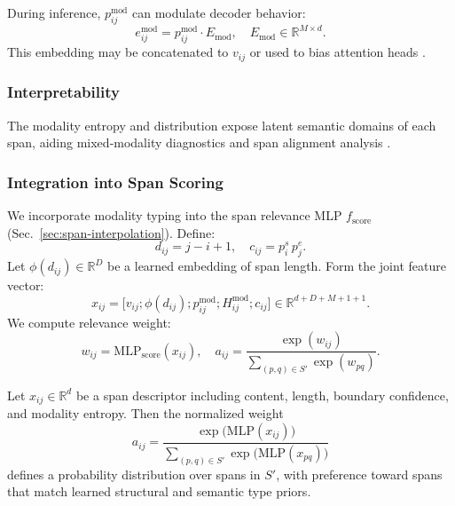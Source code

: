 During inference, \(p^{\mathrm{mod}}_{ij}\) can modulate decoder behavior:
\[
e^{\mathrm{mod}}_{ij} = p^{\mathrm{mod}}_{ij} \cdot E_{\mathrm{mod}},
\quad
E_{\mathrm{mod}}\in\mathbb{R}^{M\times d}.
\]
This embedding may be concatenated to \(v_{ij}\) or used to bias attention heads \cite{li2021prefix}.

\subsubsection{Interpretability}

The modality entropy and distribution expose latent semantic domains of each span, aiding mixed‐modality diagnostics and span alignment analysis \cite{lin2021codemix, tay2021charformer}.

\subsubsection{Integration into Span Scoring}

We incorporate modality typing into the span relevance MLP \(f_{\mathrm{score}}\) (Sec.~\ref{sec:span-interpolation}). Define:
\[
d_{ij} = j - i + 1,
\quad
c_{ij} = p^s_i\,p^e_j.
\]
Let \(\phi(d_{ij})\in\mathbb{R}^D\) be a learned embedding of span length. Form the joint feature vector:
\[
x_{ij}
= \bigl[
v_{ij};
\phi(d_{ij});
p^{\mathrm{mod}}_{ij};
H^{\mathrm{mod}}_{ij};
c_{ij}
\bigr]
\in \mathbb{R}^{d + D + M + 1 + 1}.
\]
We compute relevance weight:
\[
w_{ij} = \mathrm{MLP}_{\mathrm{score}}(x_{ij}),
\quad
a_{ij} = \frac{\exp(w_{ij})}{\sum_{(p,q)\in S'}\exp(w_{pq})}.
\]

\begin{proposition}
	Let \(x_{ij}\in\mathbb{R}^d\) be a span descriptor including content, length, boundary confidence, and modality entropy.  Then the normalized weight
	\[
	a_{ij}
	= \frac{\exp\bigl(\mathrm{MLP}(x_{ij})\bigr)}
	{\sum_{(p,q)\in S'} \exp\bigl(\mathrm{MLP}(x_{pq})\bigr)}
	\]
	defines a probability distribution over spans in \(S'\), with preference toward spans that match learned structural and semantic type priors.
\end{proposition}

